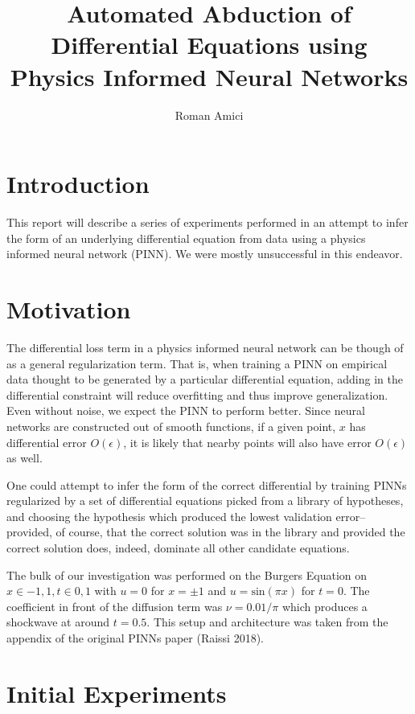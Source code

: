 \documentclass[12pt, fullpage,letterpaper]{article}
\title{Automated Abduction of Differential Equations using Physics Informed Neural Networks}
\author{Roman Amici}
\begin{document}
\maketitle

\section{Introduction}

This report will describe a series of experiments performed in an attempt to infer the form of an underlying differential equation from data using a physics informed neural network (PINN). We were mostly unsuccessful in this endeavor.

\section{Motivation}

The differential loss term in a physics informed neural network can be though of as a general regularization term. That is, when training a PINN on empirical data thought to be generated by a particular differential equation, adding in the differential constraint will reduce overfitting and thus improve generalization. Even without noise, we expect the PINN to perform better. Since neural networks are constructed out of smooth functions, if a given point, $x$ has differential error $O(\epsilon)$, it is likely that nearby points will also have error $O(\epsilon)$ as well.

One could attempt to infer the form of the correct differential by training PINNs regularized by a set of differential equations picked from a library of hypotheses, and choosing the hypothesis which produced the lowest validation error-- provided, of course, that the correct solution was in the library and provided the correct solution does, indeed, dominate all other candidate equations.

The bulk of our investigation was performed on the Burgers Equation on $x \in {-1,1}, t \in {0,1}$ with $u = 0$ for $x = \pm 1$ and $u = \text{sin}(\pi x)$ for $t=0$. The coefficient in front of the diffusion term was $\nu=0.01/\pi$ which produces a shockwave at around $t=0.5$. This setup and architecture was taken from the appendix of the original PINNs paper (Raissi 2018).

\section{Initial Experiments}
\end{document}

